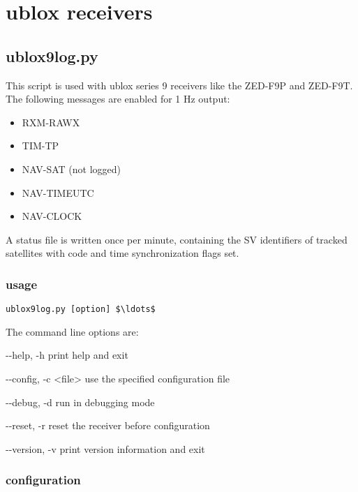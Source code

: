 \section{ublox receivers}

\subsection{ublox9log.py} \hypertarget{h:ublox9log}{}

This  script is used with ublox series 9 receivers like the ZED-F9P and ZED-F9T.
The following messages are enabled for 1 Hz output:
\begin{itemize}
	\item RXM-RAWX 
	\item TIM-TP
	\item NAV-SAT (not logged)
	\item NAV-TIMEUTC
	\item NAV-CLOCK
\end{itemize}

A status file is written once per minute, containing the SV identifiers of tracked satellites with
code and time synchronization flags set.

\subsubsection{usage}

\begin{lstlisting}[mathescape=true]
ublox9log.py [option] $\ldots$ 
\end{lstlisting}

The command line options are:
\begin{description*}
	\item[-{}-help, -h] print help and exit
	\item[-{}-config, -c \textless file\textgreater] use the specified configuration file
	\item[-{}-debug, -d] run in debugging mode
	\item[-{}-reset, -r]  reset the receiver before configuration
	\item[-{}-version, -v] print version information and exit
\end{description*}


\subsubsection{configuration}

